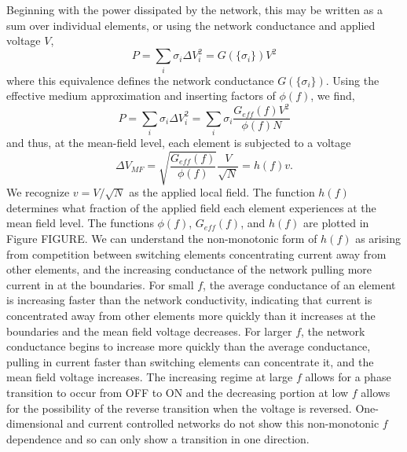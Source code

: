 \documentclass[aps,prl,reprint,groupedaddress]{revtex4-1}
\begin{document}
Beginning with the power dissipated by the network, this may be written as a
sum over individual elements, or using the network conductance and applied
voltage $V$,
\[P = \sum_i \sigma_i \Delta V_i^2 = G(\{\sigma_i\}) V^2\]
where this equivalence defines the network conductance $G(\{\sigma_i\})$.
Using the effective medium approximation and inserting factors of $\phi(f)$,
we find,
\[P = \sum_i \sigma_i \Delta V_i^2 = \sum_i \sigma_i \frac{G_{eff}(f)V^2}
{\phi(f) N}\]
and thus, at the mean-field level, each element is subjected to a voltage
\[\Delta V_{MF} = \sqrt{\frac{G_{eff}(f)}{\phi(f)}}\frac{V}{\sqrt{N}}
= h(f) v.\]
We recognize $v=V/\sqrt{N}$ as the applied local field.  The function
$h(f)$ determines what fraction of the applied field each element
experiences at the mean field level.  The functions $\phi(f)$, $G_{eff}(f)$,
and $h(f)$ are plotted in Figure FIGURE. We can understand the non-monotonic
form of $h(f)$ as arising from competition between switching elements
concentrating current away from other elements, and the increasing conductance
of the network pulling more current in at the boundaries.  For small $f$, the
average conductance of an element is increasing faster than the network
conductivity, indicating that current is concentrated away from other elements
more quickly than it increases at the boundaries and the mean field voltage
decreases.  For larger $f$, the network conductance begins to increase more
quickly than the average conductance, pulling in current faster than switching
elements can concentrate it, and the mean field voltage increases.  The
increasing regime at large $f$ allows for a phase transition to occur from
OFF to ON and the decreasing portion at low $f$ allows for the possibility
of the reverse transition when the voltage is reversed.  One-dimensional and
current controlled networks do not show this non-monotonic $f$ dependence and
so can only show a transition in one direction.
\end{document}
